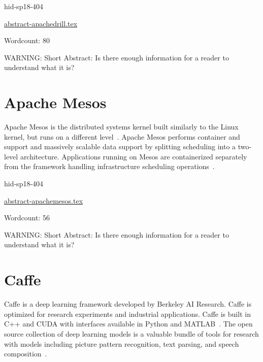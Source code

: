 \begin{IU}

hid-sp18-404

\href{https://github.com/cloudmesh-community/hid-sp18-404/blob/master//technology/abstract-apachedrill.tex}{abstract-apachedrill.tex}

 

Wordcount: 80

WARNING: Short Abstract: Is there enough information for a reader to understand what it is?

\end{IU}

\section{Apache Mesos}

Apache Mesos is the distributed systems kernel 
built similarly to the Linux kernel, but runs 
on a different level~\cite{hid-sp18-404-Apache2018}. 
Apache Mesos performs container and support and 
massively scalable data support by splitting 
scheduling into a two-level architecture. 
Applications running on Mesos are containerized separately 
from the framework handling infrastructure scheduling 
operations~\cite{hid-sp18-404-Mesos2018}.  

\begin{IU}

hid-sp18-404

\href{https://github.com/cloudmesh-community/hid-sp18-404/blob/master//technology/abstract-apachemesos.tex}{abstract-apachemesos.tex}

 

Wordcount: 56

WARNING: Short Abstract: Is there enough information for a reader to understand what it is?

\end{IU}

\section{Caffe}

Caffe is a deep learning framework developed by Berkeley AI Research. 
Caffe is optimized for research experiments and industrial applications. 
Caffe is built in C++ and CUDA with interfaces available in Python and 
MATLAB~\cite{hid-sp18-404-Evan}. The open source collection 
of deep learning models is a valuable bundle of tools for research with 
models including picture pattern recognition, text parsing, and speech 
composition~\cite{hid-sp18-404-jia2014caffe}. 


